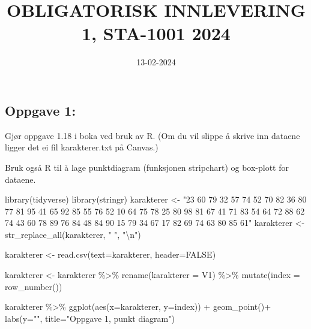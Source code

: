 \documentclass[
  12pt,
  a4paper,
  DIV=11,
  numbers=noendperiod]{scrartcl}
\title{OBLIGATORISK INNLEVERING 1, STA-1001 2024}
\author{}
\date{13-02-2024}
\newenvironment{Shaded}{\begin{snugshade}}{\end{snugshade}}
\newcommand{\AttributeTok}[1]{\textcolor[rgb]{0.40,0.45,0.13}{#1}}
\newcommand{\ConstantTok}[1]{\textcolor[rgb]{0.56,0.35,0.01}{#1}}
\newcommand{\FunctionTok}[1]{\textcolor[rgb]{0.28,0.35,0.67}{#1}}
\newcommand{\NormalTok}[1]{\textcolor[rgb]{0.00,0.23,0.31}{#1}}
\newcommand{\OtherTok}[1]{\textcolor[rgb]{0.00,0.23,0.31}{#1}}
\newcommand{\SpecialCharTok}[1]{\textcolor[rgb]{0.37,0.37,0.37}{#1}}
\newcommand{\StringTok}[1]{\textcolor[rgb]{0.13,0.47,0.30}{#1}}
\renewcommand*\contentsname{Table of contents}
\newcommand\contentsname{Table of contents}
\begin{document}
\maketitle
\begin{abstract}
\hfill\break
\hfill\break
\hfill\break
\hfill\break
\hfill\break
\hfill\break
\hfill\break
\hfill\break
\hfill\break
\hfill\break
\hfill\break
\hfill\break
\hfill\break
\hfill\break
\hfill\break
\hfill\break
\hfill\break
\hfill\break
\hfill\break
\hfill\break
\hfill\break
\hfill\break
\hfill\break
\hfill\break
\hfill\break
\hfill\break
\hfill\break
\hfill\break
\hfill\break
\hfill\break
\hfill\break
\end{abstract}

\renewcommand*\contentsname{Innholdsfortegnelse}
{
\hypersetup{linkcolor=black}
\setcounter{tocdepth}{3}
\tableofcontents
}
\clearpage

\subsection{Oppgave 1:}\label{oppgave-1}

Gjør oppgave 1.18 i boka ved bruk av R. (Om du vil slippe å skrive inn
dataene ligger det ei fil karakterer.txt på Canvas.)

Bruk også R til å lage punktdiagram (funksjonen stripchart) og box-plott
for dataene.

\begin{Shaded}
\begin{Highlighting}[]
\FunctionTok{library}\NormalTok{(tidyverse)}
\FunctionTok{library}\NormalTok{(stringr)}
\NormalTok{karakterer }\OtherTok{\textless{}{-}} \StringTok{"23 60 79 32 57 74 52 70 82 36 80 77 81 95 41 65 92 85 55 76 52 10 64 75 78 25 80 98 81 67 41 71 83 54 64 72 88 62 74 43 60 78 89 76 84 48 84 90 15 79 34 67 17 82 69 74 63 80 85 61"}
\NormalTok{karakterer }\OtherTok{\textless{}{-}} \FunctionTok{str\_replace\_all}\NormalTok{(karakterer, }\StringTok{" "}\NormalTok{, }\StringTok{"}\SpecialCharTok{\textbackslash{}n}\StringTok{"}\NormalTok{)}


\NormalTok{karakterer }\OtherTok{\textless{}{-}} \FunctionTok{read.csv}\NormalTok{(}\AttributeTok{text=}\NormalTok{karakterer, }\AttributeTok{header=}\ConstantTok{FALSE}\NormalTok{) }

\NormalTok{karakterer }\OtherTok{\textless{}{-}}\NormalTok{ karakterer }\SpecialCharTok{\%\textgreater{}\%} 
  \FunctionTok{rename}\NormalTok{(}\AttributeTok{karakterer =}\NormalTok{ V1) }\SpecialCharTok{\%\textgreater{}\%} 
  \FunctionTok{mutate}\NormalTok{(}\AttributeTok{index =} \FunctionTok{row\_number}\NormalTok{())}


\NormalTok{karakterer }\SpecialCharTok{\%\textgreater{}\%} 
  \FunctionTok{ggplot}\NormalTok{(}\FunctionTok{aes}\NormalTok{(}\AttributeTok{x=}\NormalTok{karakterer, }\AttributeTok{y=}\NormalTok{index)) }\SpecialCharTok{+} 
  \FunctionTok{geom\_point}\NormalTok{()}\SpecialCharTok{+}
  \FunctionTok{labs}\NormalTok{(}\AttributeTok{y=}\StringTok{""}\NormalTok{, }\AttributeTok{title=}\StringTok{"Oppgave 1, punkt diagram"}\NormalTok{)}
\end{Highlighting}
\end{Shaded}
\end{document}
